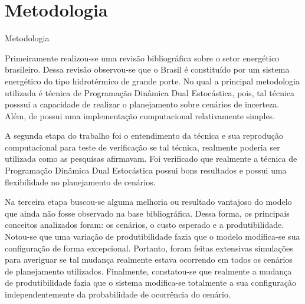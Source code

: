 \documentclass[12pt]{beamer}
\begin{document}
\section{Metodologia}
\begin{frame}{Metodologia}
	\begin{justify}	
		Primeiramente realizou-se uma revis\~ao bibliogr\'afica sobre o setor energ\'etico brasileiro. Dessa revis\~ao
		observou-se que o Brasil \'e constitu\'ido por um sistema energ\'etico do tipo hidrot\'ermico de grande porte. No qual a
		principal metodologia utilizada \'e t\'ecnica de Programa\c c\~ao Din\^amica Dual Estoc\'astica, pois, tal t\'ecnica
		posssui a capacidade de realizar o planejamento sobre cen\'arios de incerteza. Al\'em, de possui uma implementa\c c\~ao
		computacional relativamente simples.
	\end{justify}
\end{frame}

\begin{frame}
	\begin{justify}	
	A segunda etapa do trabalho foi o entendimento da t\'ecnica e sua reprodu\c c\~ao computacional para teste de verifica\c
	c\~ao se tal t\'ecnica, realmente poderia ser utilizada como as pesquisas afirmavam. Foi verificado que realmente a
	t\'ecnica de Programa\c c\~ao Din\^amica Dual Estoc\'astica possui bons resultados e possui uma flexibilidade no
	planejamento de cen\'arios. 
	\end{justify}
\end{frame}

\begin{frame}
	\begin{justify}	
	Na terceira etapa buscou-se alguma melhoria ou resultado vantajoso do modelo que ainda n\~ao fosse  observado na base
	bibliogr\'afica. Dessa forma, os principais conceitos analizados foram: os cen\'arios, o custo esperado e a
	produtibilidade. Notou-se que uma varia\c c\~ao de produtibilidade fazia que o modelo modifica-se sua configura\c c\~ao
	de forma excepcional. Portanto, foram feitas extensivas simula\c c\~oes para averiguar se tal mudan\c ca realmente
	estava ocorrendo em todos os cen\'arios de planejamento  utilizados. Finalmente, constatou-se que realmente a mudan\c ca
	de produtibilidade fazia que o sistema modifica-se totalmente a sua configura\c c\~ao independentemente da probabilidade
	de ocorr\^encia do cen\'ario.
	\end{justify}
\end{frame}
\end{document}
